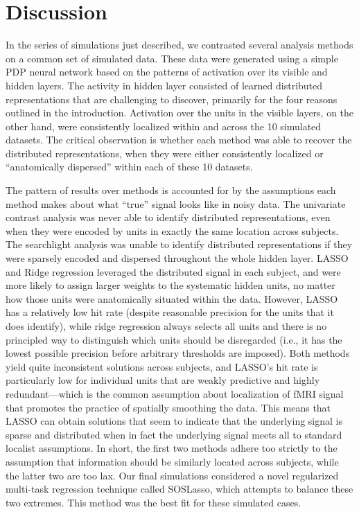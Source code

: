 \section{Discussion}
In the series of simulations just described, we contrasted several analysis methods on a common set of simulated data. These data were generated using a simple PDP neural network based on the patterns of activation over its visible and hidden layers. The activity in hidden layer consisted of learned distributed representations that are challenging to discover, primarily for the four reasons outlined in the introduction. Activation over the units in the visible layers, on the other hand, were consistently localized within and across the 10 simulated datasets. The critical observation is whether each method was able to recover the distributed representations, when they were either consistently localized or ``anatomically dispersed'' within each of these 10 datasets.  

The pattern of results over methods is accounted for by the assumptions each method makes about what ``true'' signal looks like in noisy data. The univariate contrast analysis was never able to identify distributed representations, even when they were encoded by units in exactly the same location across subjects. The searchlight analysis was unable to identify distributed representations if they were sparsely encoded and dispersed throughout the whole hidden layer. LASSO and Ridge regression leveraged the distributed signal in each subject, and were more likely to assign larger weights to the systematic hidden units, no matter how those units were anatomically situated within the data. However, LASSO has a relatively low hit rate (despite reasonable precision for the units that it does identify), while ridge regression always selects all units and there is no principled way to distinguish which units should be disregarded (i.e., it has the lowest possible precision before arbitrary thresholds are imposed). Both methods yield quite inconsistent solutions across subjects, and LASSO's hit rate is particularly low for individual units that are weakly predictive and highly redundant---which is the common assumption about localization of fMRI signal that promotes the practice of spatially smoothing the data. This means that LASSO can obtain solutions that seem to indicate that the underlying signal is sparse and distributed when in fact the underlying signal meets all to standard localist assumptions. In short, the first two methods adhere too strictly to the assumption that information should be similarly located across subjects, while the latter two are too lax.  Our final simulations	considered a novel regularized multi-task regression technique called SOSLasso, which attempts to balance these two extremes. This method was the best fit for these simulated cases.


